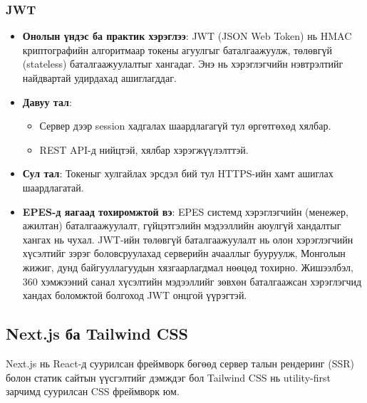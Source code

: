 \subsubsection{JWT}
\begin{itemize}
    \item \textbf{Онолын үндэс ба практик хэрэглээ}: JWT (JSON Web Token) нь HMAC криптографийн алгоритмаар токены агуулгыг баталгаажуулж, төлөвгүй (stateless) 
    баталгаажуулалтыг хангадаг. Энэ нь хэрэглэгчийн нэвтрэлтийг найдвартай удирдахад ашиглагддаг.
    \item \textbf{Давуу тал}:
    \begin{itemize}
        \item Сервер дээр session хадгалах шаардлагагүй тул өргөтгөхөд хялбар.
        \item REST API-д нийцтэй, хялбар хэрэгжүүлэлттэй.
    \end{itemize}
    \item \textbf{Сул тал}: Токеныг хулгайлах эрсдэл бий тул HTTPS-ийн хамт ашиглах шаардлагатай.
    \item \textbf{EPES-д яагаад тохиромжтой вэ}: EPES системд хэрэглэгчийн (менежер, ажилтан) баталгаажуулалт, гүйцэтгэлийн мэдээллийн аюулгүй хандалтыг хангах нь 
    чухал. JWT-ийн төлөвгүй баталгаажуулалт нь олон хэрэглэгчийн хүсэлтийг зэрэг боловсруулахад серверийн ачааллыг бууруулж, Монголын жижиг, дунд байгууллагуудын 
    хязгаарлагдмал нөөцөд тохирно. Жишээлбэл, 360 хэмжээний санал хүсэлтийн мэдээллийг зөвхөн баталгаажсан хэрэглэгчид хандах боломжтой болгоход JWT онцгой үүрэгтэй.
\end{itemize}

\subsection{Next.js ба Tailwind CSS}
Next.js нь React-д суурилсан фреймворк бөгөөд сервер талын рендеринг (SSR) болон статик сайтын үүсгэлтийг дэмждэг бол Tailwind CSS нь utility-first зарчимд суурилсан CSS фреймворк юм.

